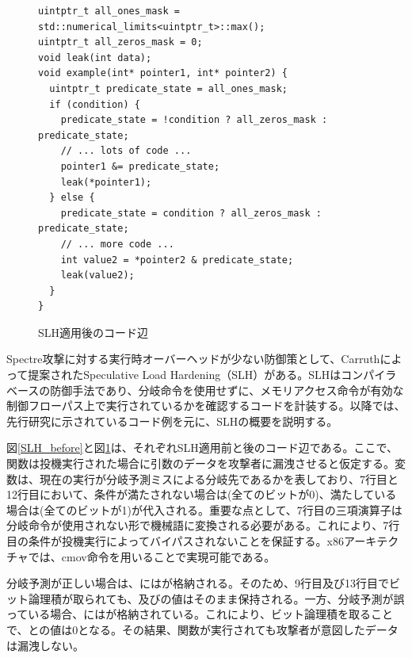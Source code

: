 \begin{figure}
  \begin{verbatim}
uintptr_t all_ones_mask = std::numerical_limits<uintptr_t>::max();
uintptr_t all_zeros_mask = 0;
void leak(int data);
void example(int* pointer1, int* pointer2) {
  uintptr_t predicate_state = all_ones_mask;
  if (condition) {
    predicate_state = !condition ? all_zeros_mask : predicate_state;
    // ... lots of code ...
    pointer1 &= predicate_state;
    leak(*pointer1);
  } else {
    predicate_state = condition ? all_zeros_mask : predicate_state;
    // ... more code ...
    int value2 = *pointer2 & predicate_state;
    leak(value2);
  }
}
\end{verbatim}
  \caption{SLH適用後のコード辺}
  \label{SLH_after}
\end{figure}

Spectre攻撃に対する実行時オーバーヘッドが少ない防御策として、Carruthによって提案されたSpeculative Load Hardening（SLH）\cite{LLVM-SLH}がある。SLHはコンパイラベースの防御手法であり、分岐命令を使用せずに、メモリアクセス命令が有効な制御フローパス上で実行されているかを確認するコードを計装する。以降では、先行研究\cite{LLVM-SLH}に示されているコード例を元に、SLHの概要を説明する。\par

図\ref{SLH_before}と図\ref{SLH_after}は、それぞれSLH適用前と後のコード辺である。ここで、関数は投機実行された場合に引数のデータを攻撃者に漏洩させると仮定する。変数は、現在の実行が分岐予測ミスによる分岐先であるかを表しており、7行目と12行目において、条件が満たされない場合は(全てのビットが0)、満たしている場合は(全てのビットが1)が代入される。重要な点として、7行目の三項演算子は分岐命令が使用されない形で機械語に変換される必要がある。これにより、7行目の条件が投機実行によってバイパスされないことを保証する。x86アーキテクチャでは、cmov命令を用いることで実現可能である\cite{LLVM-SLH}。\par
分岐予測が正しい場合は、にはが格納される。そのため、9行目及び13行目でビット論理積が取られても、及びの値はそのまま保持される。一方、分岐予測が誤っている場合、にはが格納されている。これにより、ビット論理積を取ることで、との値は0となる。その結果、関数が実行されても攻撃者が意図したデータは漏洩しない。\par

